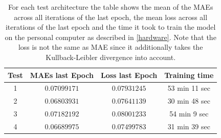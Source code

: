 \begin{center}
    \begin{table}[H]
        \centering
        \begin{tabular}{ | c | c | c | c | }
            \hline
            Test &MAEs last Epoch & Loss last Epoch & Training time\\ \hline
            1 & $0.07099171$  & $0.07931245$  & 53 min 11 sec  \\
            2 & $0.06803931$  & $0.07641139$  & 30 min 48 sec  \\
            3 & $0.07182192$  & $0.08001233$  & 54 min 9 sec  \\  
            4 & $0.06689975$  & $0.07499783$  & 31 min 39 sec  \\  
            \hline
        \end{tabular} 
        \caption{For each test architecture the table shows the mean of the MAEs across all iterations of the last
        epoch, the mean loss across all iterations of the last epoch and the time it took to train the model
        on the personal computer as described in \autoref{hardware}. Note that the loss is not the same
        as MAE since it additionally takes the Kullback-Leibler divergence into account.} \label{table_maes4}
    \end{table} 
\end{center}

